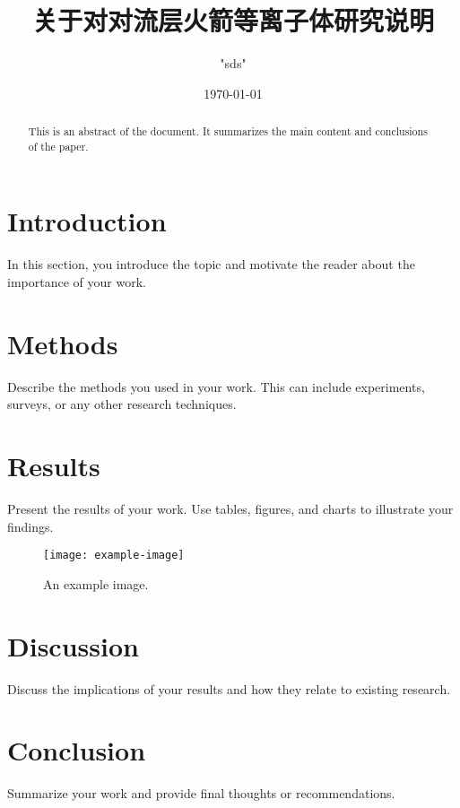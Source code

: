 \documentclass{article}
\title{关于对对流层火箭等离子体研究说明}
\author{"sds"}
\date{\today}
\begin{document}
  
  
\maketitle  
  
\tableofcontents  
  
\begin{abstract}  
This is an abstract of the document. It summarizes the main content and conclusions of the paper.  
\end{abstract}  
  
\section{Introduction}  
In this section, you introduce the topic and motivate the reader about the importance of your work.  
  
\section{Methods}  
Describe the methods you used in your work. This can include experiments, surveys, or any other research techniques.  
  
\section{Results}  
Present the results of your work. Use tables, figures, and charts to illustrate your findings.  
  
\begin{figure}[h]  
\centering  
\texttt{[image: example-image]} %
\caption{An example image.}  
\label{fig:example}  
\end{figure}  
  
\section{Discussion}  
Discuss the implications of your results and how they relate to existing research.  
  
\section{Conclusion}  
Summarize your work and provide final thoughts or recommendations.  
  
%  
  
\end{document}
